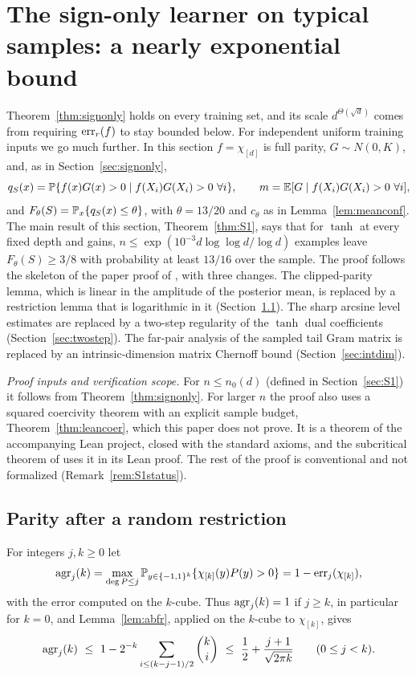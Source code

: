 \section{The sign-only learner on typical samples: a nearly exponential bound}
\label{sec:typical}
Theorem~\ref{thm:signonly} holds on every training set, and its scale
$d^{\Theta(\sqrt d)}$ comes from requiring $\operatorname{err}_r(f)$ to stay bounded
below. For independent uniform training inputs we go much further. In
this section $f=\chi_{[d]}$ is full parity, $G\sim N(0,K)$, and, as in
Section~\ref{sec:signonly},
\[
 q_S(x)=\Pp\{f(x)G(x)>0\mid f(X_i)G(X_i)>0\ \forall i\},\qquad
 m=\E[G\mid f(X_i)G(X_i)>0\ \forall i],
\]
and $F_\theta(S)=\mathbb P_x\{q_S(x)\le\theta\}$, with $\theta=13/20$ and
$c_\theta$ as in Lemma~\ref{lem:meanconf}. The
main result of this section, Theorem~\ref{thm:S1}, says that for $\tanh$ at every fixed
depth and gains, $n\le\exp(10^{-3}d\log\log d/\log d)$ examples leave
$F_\theta(S)\ge3/8$ with probability at least $13/16$ over the sample. The
proof follows the skeleton of the paper proof of
\cite[Theorem~10.2]{subcritical}, with three changes. The clipped-parity
lemma, which is linear in the amplitude of the posterior mean, is replaced
by a restriction lemma that is logarithmic in it
(Section~\ref{sec:restriction}). The sharp arcsine level estimates are
replaced by a two-step regularity of the $\tanh$ dual coefficients
(Section~\ref{sec:twostep}). The far-pair analysis of the sampled tail
Gram matrix is replaced by an intrinsic-dimension matrix Chernoff bound
(Section~\ref{sec:intdim}).

\emph{Proof inputs and verification scope.} For $n\le n_0(d)$ (defined
in Section~\ref{sec:S1}) it follows from Theorem~\ref{thm:signonly}. For
larger $n$ the proof also uses a squared coercivity theorem with an
explicit sample budget, Theorem~\ref{thm:leancoer}, which this paper does
not prove. It is a theorem of the accompanying Lean project, closed with
the standard axioms, and the subcritical theorem of \cite{subcritical} uses it
in its Lean proof. The rest of the proof is conventional and not
formalized (Remark~\ref{rem:S1status}).

\subsection{Parity after a random restriction}\label{sec:restriction}
For integers $j,k\ge0$ let
\[
 \operatorname{agr}_j(k)=\max_{\deg P\le j}\mathbb P_{y\in\{-1,1\}^k}\{\chi_{[k]}(y)P(y)>0\}
 =1-\operatorname{err}_j(\chi_{[k]}),
\]
with the error computed on the $k$-cube. Thus $\operatorname{agr}_j(k)=1$ if $j\ge k$,
in particular for $k=0$, and Lemma~\ref{lem:abfr}, applied on the $k$-cube
to $\chi_{[k]}$, gives
\begin{equation}\label{eq:agr}
 \operatorname{agr}_j(k)\ \le\ 1-2^{-k}\sum_{i\le(k-j-1)/2}\binom ki
 \ \le\ \frac12+\frac{j+1}{\sqrt{2\pi k}}\qquad(0\le j<k).
\end{equation}

